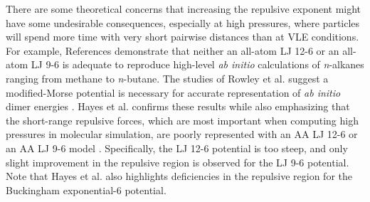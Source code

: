 \documentclass[preprint,letterpaper,floatfix,citeautoscript,aip,jcp]{revtex4-1}
\begin{document}

There are some theoretical concerns that increasing the repulsive exponent might have some undesirable consequences, especially at high pressures, where 
particles will spend more time with very short  pairwise distances
than at VLE conditions. For example, References  demonstrate that neither an all-atom LJ 12-6 or an all-atom LJ 9-6 is adequate to reproduce high-level \textit{ab initio} calculations of \textit{n}-alkanes ranging from methane to \textit{n}-butane. 
The studies of Rowley et al. suggest a modified-Morse potential is necessary for accurate representation of \textit{ab initio} dimer energies \cite{Rowley1999,Rowley2001}. Hayes et al. confirms these results while also emphasizing that the short-range repulsive forces, which are most important when computing high pressures in molecular simulation, are poorly represented with an AA LJ 12-6 or an AA LJ 9-6 model \cite{Hayes2004}. Specifically, the LJ 12-6 potential is too steep, and only slight improvement in the repulsive region is observed for the LJ 9-6 potential. %
Note that Hayes et al. also highlights deficiencies in the repulsive region for the Buckingham exponential-6 potential. 
\end{document}
